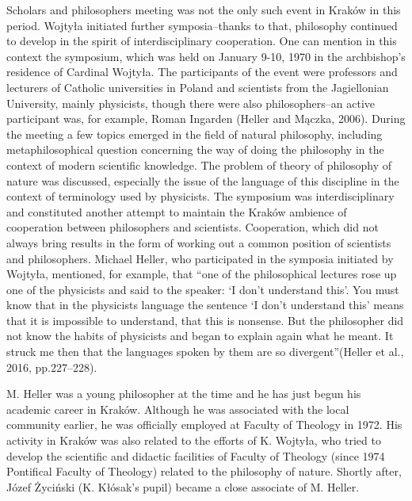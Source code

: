\documentclass[a4paper]{article}
\begin{document}
Scholars and philosophers meeting was not the only such event in Kraków in this period. Wojtyła initiated further
symposia–thanks to that, philosophy continued to develop in the spirit of interdisciplinary cooperation. One can
mention in this context the symposium, which was held on January 9-10, 1970 in the archbishop's residence of Cardinal
Wojtyła. The participants of the event were professors and lecturers of Catholic universities in Poland and scientists
from the Jagiellonian University, mainly physicists, though there were also philosophers–an active participant was, for
example, Roman Ingarden \label{ref:RND0cLhaGNzvH}(Heller and Mączka, 2006). During the meeting a few topics emerged in
the field of natural philosophy, including metaphilosophical question concerning the way of doing the philosophy in the
context of modern scientific knowledge. The problem of theory of philosophy of nature was discussed, especially the
issue of the language of this discipline in the context of terminology used by physicists. The symposium was
interdisciplinary and constituted another attempt to maintain the Kraków ambience of cooperation between philosophers
and scientists. Cooperation, which did not always bring results in the form of working out a common position of
scientists and philosophers. Michael Heller, who participated in the symposia initiated by Wojtyła, mentioned, for
example, that “one of the philosophical lectures rose up one of the physicists and said to the speaker: ‘I don’t
understand this’. You must know that in the physicists language the sentence ‘I don’t understand this’ means that it is
impossible to understand, that this is nonsense. But the philosopher did not know the habits of physicists and began to
explain again what he meant. It struck me then that the languages spoken by them are so
divergent”\label{ref:RNDltUtn6TtE2}(Heller et al., 2016, pp.227–228).

M. Heller was a young philosopher at the time and he has just begun his academic career in Kraków. Although he was
associated with the local community earlier, he was officially employed at Faculty of Theology in 1972. His activity in
Kraków was also related to the efforts of K. Wojtyła, who tried to develop the scientific and didactic facilities of
Faculty of Theology (since 1974 Pontifical Faculty of Theology) related to the philosophy of nature. Shortly after,
Józef Życiński (K. Kłósak's pupil) became a close associate of M. Heller.
\end{document}
